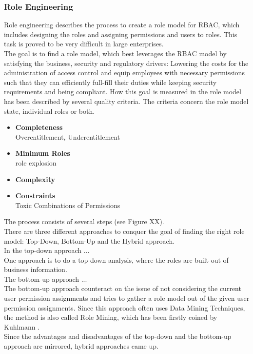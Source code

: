         \subsubsection{Role Engineering}
        Role engineering \cite{coyne2011role} describes the process to create a role model for RBAC, which includes designing the roles and assigning permissions and users to roles. This task is proved to be very difficult in large enterprises.\\The goal is to find a role model, which best leverages the RBAC model by satisfying the business, security and regulatory drivers: Lowering the costs for the administration of access control and equip employees with necessary permissions such that they can efficiently full-fill their duties while keeping security requirements and being compliant.
        How this goal is measured in the role model has been described by several quality criteria\cite{Kunz}\cite{}. The criteria concern the role model state, individual roles or both.
        \begin{itemize}
            \item \textbf{Completeness}\\
            
            Overentitlement, Underentitlement\\ 
            \item \textbf{Minimum Roles}\\
             role explosion\\
            \item \textbf{Complexity}\\
            \item \textbf{Constraints}\\
            Toxic Combinations of Permissions\\
        \end{itemize}
        
        
        The process consists of several steps (see Figure XX).\\
        
        
        There are three different approaches to conquer the goal of finding the right role model: Top-Down, Bottom-Up and the Hybrid approach.\\
        In the top-down approach ...\\
        One approach is to do a top-down analysis, where the roles are built out of business information.\\
        The bottom-up approach ...\\
        The bottom-up approach counteract on the issue of not considering the current user permission assignments and tries to gather a role model out of the given user permission assignments. Since this approach often uses Data Mining Techniques, the method is also called Role Mining, which has been firstly coined by Kuhlmann \cite{Kuhlmann}.\\
        Since the advantages and disadvantages of the top-down and the bottom-up approach are mirrored, hybrid approaches came up.
        
